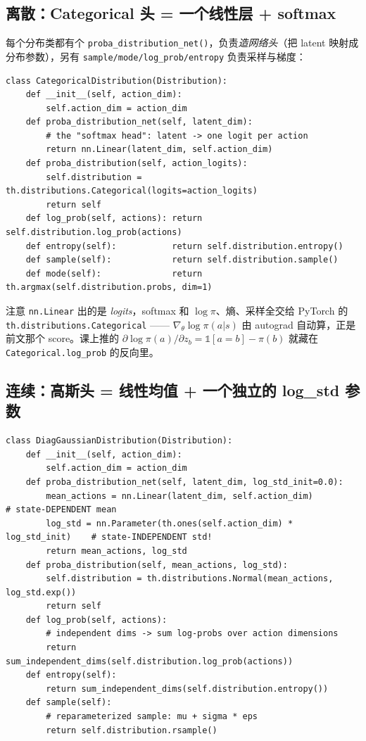 \documentclass[11pt,a4paper]{article}
\begin{document}
\subsection{离散：Categorical 头 = 一个线性层 + softmax}

每个分布类都有个 \texttt{proba\_distribution\_net()}，负责\emph{造网络头}（把 latent 映射成分布参数），另有 \texttt{sample/mode/log\_prob/entropy} 负责采样与梯度：

\begin{lstlisting}
class CategoricalDistribution(Distribution):
    def __init__(self, action_dim):
        self.action_dim = action_dim
    def proba_distribution_net(self, latent_dim):
        # the "softmax head": latent -> one logit per action
        return nn.Linear(latent_dim, self.action_dim)
    def proba_distribution(self, action_logits):
        self.distribution = th.distributions.Categorical(logits=action_logits)
        return self
    def log_prob(self, actions): return self.distribution.log_prob(actions)
    def entropy(self):           return self.distribution.entropy()
    def sample(self):            return self.distribution.sample()
    def mode(self):              return th.argmax(self.distribution.probs, dim=1)
\end{lstlisting}

\begin{tiebox}
注意 \texttt{nn.Linear} 出的是 \emph{logits}，softmax 和 $\log\pi$、熵、采样全交给 PyTorch 的 \texttt{th.distributions.Categorical} —— $\nabla_\theta\log\pi(a|s)$ 由 autograd 自动算，正是前文那个 score。课上推的 $\partial\log\pi(a)/\partial z_b=\mathbb{1}[a{=}b]-\pi(b)$ 就藏在 \texttt{Categorical.log\_prob} 的反向里。
\end{tiebox}

\subsection{连续：高斯头 = 线性均值 + 一个独立的 log\_std 参数}

\begin{lstlisting}
class DiagGaussianDistribution(Distribution):
    def __init__(self, action_dim):
        self.action_dim = action_dim
    def proba_distribution_net(self, latent_dim, log_std_init=0.0):
        mean_actions = nn.Linear(latent_dim, self.action_dim)              # state-DEPENDENT mean
        log_std = nn.Parameter(th.ones(self.action_dim) * log_std_init)    # state-INDEPENDENT std!
        return mean_actions, log_std
    def proba_distribution(self, mean_actions, log_std):
        self.distribution = th.distributions.Normal(mean_actions, log_std.exp())
        return self
    def log_prob(self, actions):
        # independent dims -> sum log-probs over action dimensions
        return sum_independent_dims(self.distribution.log_prob(actions))
    def entropy(self):
        return sum_independent_dims(self.distribution.entropy())
    def sample(self):
        # reparameterized sample: mu + sigma * eps
        return self.distribution.rsample()
\end{lstlisting}
\end{document}
